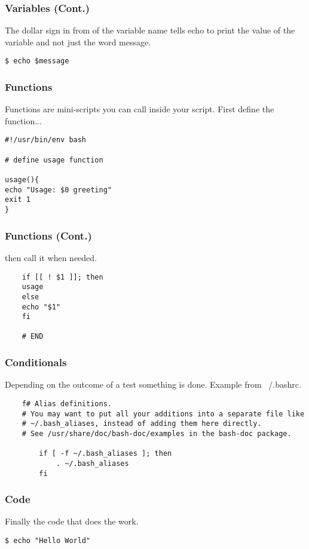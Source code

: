 \documentclass[handout]{beamer}
\begin{document}
\begin{frame}[fragile]
  \frametitle{Variables (Cont.)}
  The dollar sign in from of the variable name tells echo to print the value of the variable and not just the word message.
\begin{block}{}
\begin{verbatim}
$ echo $message
\end{verbatim}
\end{block}
\end{frame}
\begin{frame}[fragile]
  \frametitle{Functions}
  Functions are mini-scripts you can call inside your script. First define the function...
\begin{block}{}
\begin{verbatim}
#!/usr/bin/env bash

# define usage function

usage(){
echo "Usage: $0 greeting"
exit 1
}
\end{verbatim}
\end{block}
\end{frame}
\begin{frame}[fragile]
  \frametitle{Functions (Cont.)}
  then call it when needed.
\begin{block}{}
\begin{verbatim}
	if [[ ! $1 ]]; then
	usage
	else
	echo "$1"
	fi

	# END
\end{verbatim}
\end{block}
\end{frame}
\begin{frame}[fragile]
  \frametitle{Conditionals}
  Depending on the outcome of a test something is done. Example from ~/.bashrc.
\begin{block}{}
\begin{verbatim}
	f# Alias definitions.
	# You may want to put all your additions into a separate file like
	# ~/.bash_aliases, instead of adding them here directly.
	# See /usr/share/doc/bash-doc/examples in the bash-doc package.

		if [ -f ~/.bash_aliases ]; then
		    . ~/.bash_aliases
		fi
\end{verbatim}
\end{block}
\end{frame}
\begin{frame}[fragile]
  \frametitle{Code}
  Finally the code that does the work.
\begin{verbatim}
$ echo "Hello World"
\end{verbatim}

\end{frame}
\end{document}
